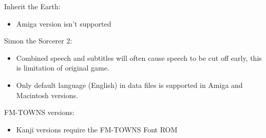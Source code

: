 Inherit the Earth:
  \begin{itemize}
  \item Amiga version isn't supported
  \end{itemize}
Simon the Sorcerer 2:
  \begin{itemize}
  \item Combined speech and subtitles will often cause speech to be
                 cut off early, this is limitation of original game.
  \item Only default language (English) in data files is supported
                 in Amiga and Macintosh versions.
  \end{itemize}
FM-TOWNS versions:
  \begin{itemize}
  \item Kanji versions require the FM-TOWNS Font ROM
  \end{itemize}

